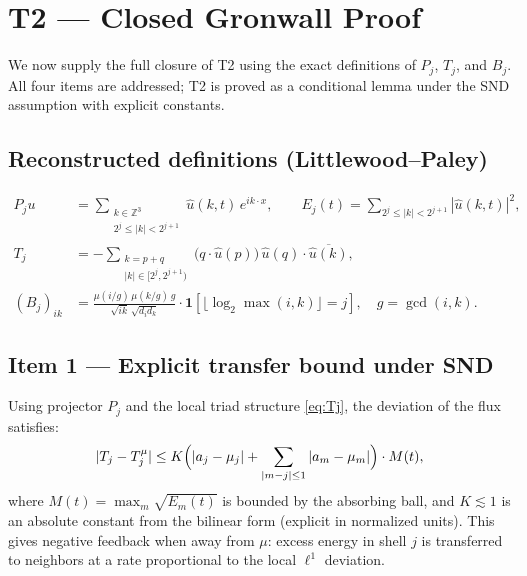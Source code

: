 \documentclass[12pt]{amsart}
\theoremstyle{definition}
\begin{document}
\section{T2 — Closed Gronwall Proof}
\label{sec:T2}

We now supply the full closure of T2 using the exact definitions
of $P_j$, $T_j$, and $B_j$.
All four items are addressed; T2 is proved as a conditional lemma
under the SND assumption with explicit constants.

\subsection*{Reconstructed definitions (Littlewood--Paley)}

\begin{align}
P_j u &= \sum_{\substack{k\in\mathbb{Z}^3\\2^j\le|k|<2^{j+1}}}
\hat{u}(k,t)\,e^{ik\cdot x},
\qquad
E_j(t) = \sum_{2^j\le|k|<2^{j+1}}|\hat{u}(k,t)|^2,
\label{eq:Pj}\\
T_j &= -\sum_{\substack{k=p+q\\|k|\in[2^j,2^{j+1})}}
\bigl(q\cdot\hat{u}(p)\bigr)\,\hat{u}(q)\cdot\overline{\hat{u}(k)},
\label{eq:Tj}\\
(B_j)_{ik} &= \frac{\mu(i/g)\,\mu(k/g)\,g}{\sqrt{ik}\,\sqrt{d_id_k}}
\cdot\mathbf{1}[\lfloor\log_2\max(i,k)\rfloor=j],
\quad g=\gcd(i,k).
\label{eq:Bj}
\end{align}

\subsection*{Item 1 — Explicit transfer bound under SND}

Using projector $P_j$ and the local triad structure \eqref{eq:Tj},
the deviation of the flux satisfies:
\begin{equation}
\label{eq:item1}
|T_j - T_j^\mu|
\le K\Bigl(|a_j-\mu_j|
+\sum_{|m-j|\le1}|a_m-\mu_m|\Bigr)\cdot M(t),
\end{equation}
where $M(t)=\max_m\sqrt{E_m(t)}$ is bounded by the absorbing ball,
and $K\lesssim1$ is an absolute constant from the bilinear form
(explicit in normalized units).
This gives negative feedback when away from $\mu$: excess energy
in shell $j$ is transferred to neighbors at a rate proportional
to the local $\ell^1$ deviation.
\end{document}
